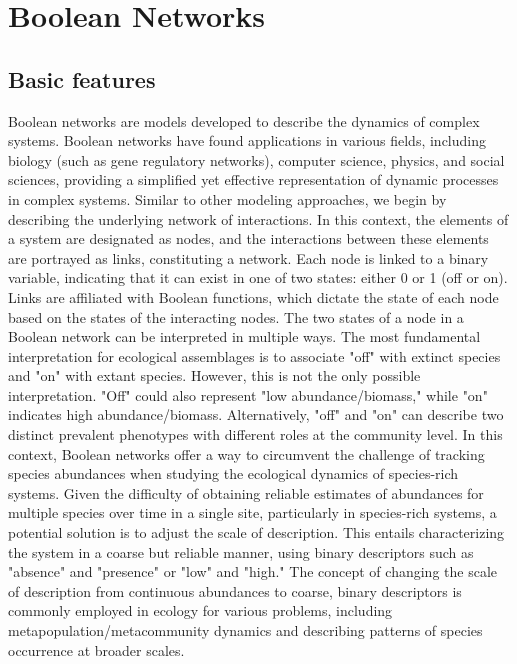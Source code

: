 \documentclass[10pt]{article}
\begin{document}
\section{Boolean Networks}

\subsection{Basic features}
Boolean networks are models developed to describe the dynamics of complex systems. Boolean networks have found applications in various fields, including biology (such as gene regulatory networks), computer science, physics, and social sciences, providing a simplified yet effective representation of dynamic processes in complex systems. Similar to other modeling approaches, we begin by describing the underlying network of interactions. In this context, the elements of a system are designated as nodes, and the interactions between these elements are portrayed as links, constituting a network. Each node is linked to a binary variable, indicating that it can exist in one of two states: either 0 or 1 (off or on). Links are affiliated with Boolean functions, which dictate the state of each node based on the states of the interacting nodes.
The two states of a node in a Boolean network can be interpreted in multiple ways. The most fundamental interpretation for ecological assemblages is to associate "off" with extinct species and "on" with extant species. However, this is not the only possible interpretation. "Off" could also represent "low abundance/biomass," while "on" indicates high abundance/biomass. Alternatively, "off" and "on" can describe two distinct prevalent phenotypes with different roles at the community level. In this context, Boolean networks offer a way to circumvent the challenge of tracking species abundances when studying the ecological dynamics of species-rich systems. Given the difficulty of obtaining reliable estimates of abundances for multiple species over time in a single site, particularly in species-rich systems, a potential solution is to adjust the scale of description. This entails characterizing the system in a coarse but reliable manner, using binary descriptors such as "absence" and "presence" or "low" and "high." The concept of changing the scale of description from continuous abundances to coarse, binary descriptors is commonly employed in ecology for various problems, including metapopulation/metacommunity dynamics and describing patterns of species occurrence at broader scales.
\end{document}
